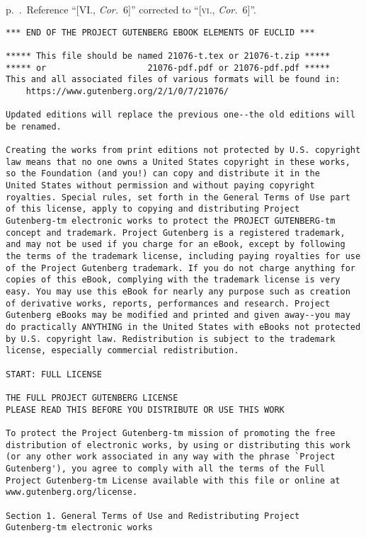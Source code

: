 \documentclass[oneside]{book}
\begin{document}
p.~\pageref{XIvi}.~Reference ``[VI\@., \emph{Cor.}~6]'' corrected to ``[\textsc{vi.}, \emph{Cor.}~6]''.

\newpage
\small
{}
\begin{verbatim}
*** END OF THE PROJECT GUTENBERG EBOOK ELEMENTS OF EUCLID ***

***** This file should be named 21076-t.tex or 21076-t.zip *****
***** or                    21076-pdf.pdf or 21076-pdf.pdf *****
This and all associated files of various formats will be found in:
    https://www.gutenberg.org/2/1/0/7/21076/

Updated editions will replace the previous one--the old editions will
be renamed.

Creating the works from print editions not protected by U.S. copyright
law means that no one owns a United States copyright in these works,
so the Foundation (and you!) can copy and distribute it in the
United States without permission and without paying copyright
royalties. Special rules, set forth in the General Terms of Use part
of this license, apply to copying and distributing Project
Gutenberg-tm electronic works to protect the PROJECT GUTENBERG-tm
concept and trademark. Project Gutenberg is a registered trademark,
and may not be used if you charge for an eBook, except by following
the terms of the trademark license, including paying royalties for use
of the Project Gutenberg trademark. If you do not charge anything for
copies of this eBook, complying with the trademark license is very
easy. You may use this eBook for nearly any purpose such as creation
of derivative works, reports, performances and research. Project
Gutenberg eBooks may be modified and printed and given away--you may
do practically ANYTHING in the United States with eBooks not protected
by U.S. copyright law. Redistribution is subject to the trademark
license, especially commercial redistribution.

START: FULL LICENSE

THE FULL PROJECT GUTENBERG LICENSE
PLEASE READ THIS BEFORE YOU DISTRIBUTE OR USE THIS WORK

To protect the Project Gutenberg-tm mission of promoting the free
distribution of electronic works, by using or distributing this work
(or any other work associated in any way with the phrase `Project
Gutenberg'), you agree to comply with all the terms of the Full
Project Gutenberg-tm License available with this file or online at
www.gutenberg.org/license.

Section 1. General Terms of Use and Redistributing Project
Gutenberg-tm electronic works


\end{verbatim}
\end{document}
